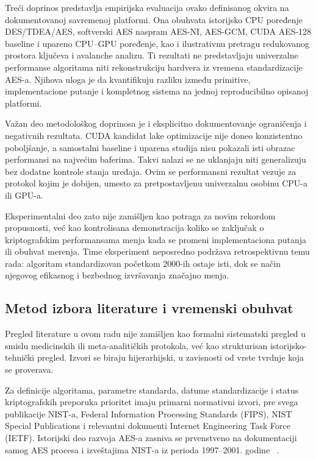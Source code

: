 Treći doprinos predstavlja empirijska evaluacija ovako definisanog
okvira na dokumentovanoj savremenoj platformi. Ona obuhvata istorijsko
CPU poređenje DES/TDEA/AES, softverski AES naspram AES-NI, AES-GCM,
CUDA AES-128 baseline i upareno CPU--GPU poređenje, kao i ilustrativnu
pretragu redukovanog prostora ključeva i avalanche analizu. Ti rezultati
ne predstavljaju univerzalne performanse algoritama niti rekonstrukciju
hardvera iz vremena standardizacije AES-a. Njihova uloga je da
kvantifikuju razliku između primitive, implementacione putanje i
kompletnog sistema na jednoj reproducibilno opisanoj platformi.

Važan deo metodološkog doprinosa je i eksplicitno dokumentovanje
ograničenja i negativnih rezultata. CUDA kandidat lake optimizacije nije
doneo konzistentno poboljšanje, a samostalni baseline i uparena studija
nisu pokazali isti obrazac performansi na najvećim baferima. Takvi nalazi
se ne uklanjaju niti generalizuju bez dodatne kontrole stanja uređaja.
Ovim se performansni rezultat vezuje za protokol kojim je dobijen, umesto
za pretpostavljenu univerzalnu osobinu CPU-a ili GPU-a.

Eksperimentalni deo zato nije zamišljen kao potraga za novim rekordom
propusnosti, već kao kontrolisana demonstracija koliko se zaključak o
kriptografskim performansama menja kada se promeni implementaciona
putanja ili obuhvat merenja. Time eksperiment neposredno podržava
retrospektivnu temu rada: algoritam standardizovan početkom 2000-ih
ostaje isti, dok se način njegovog efikasnog i bezbednog izvršavanja
značajno menja.


\subsection{Metod izbora literature i vremenski obuhvat}
\label{subsec:metod_literature}

Pregled literature u ovom radu nije zamišljen kao formalni sistematski
pregled u smislu medicinskih ili meta-analitičkih protokola, već kao
strukturisan istorijsko-tehnički pregled. Izvori se biraju hijerarhijski,
u zavisnosti od vrste tvrdnje koja se proverava.

Za definicije algoritama, parametre standarda, datume standardizacije i
status kriptografskih preporuka prioritet imaju primarni normativni
izvori, pre svega publikacije NIST-a, Federal Information Processing
Standards (FIPS), NIST Special Publications i relevantni dokumenti
Internet Engineering Task Force (IETF). Istorijski deo razvoja AES-a
zasniva se prvenstveno na dokumentaciji samog AES procesa i izveštajima
NIST-a iz perioda 1997--2001. godine
~\cite{nist-aes-report-2001,fips197-2001}.

